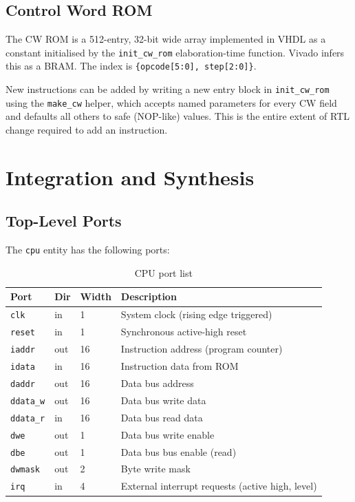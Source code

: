 \documentclass[a4paper,12pt]{report}
\newcommand{\asm}[1]{\texttt{#1}}
\newcommand{\signal}[1]{\texttt{#1}}
\begin{document}
\section{Control Word ROM}
\label{sec:cwrom}

The CW ROM is a 512-entry, 32-bit wide array implemented in VHDL as a constant initialised by the \asm{init\_cw\_rom} elaboration-time function. Vivado infers this as a BRAM. The index is \texttt{\{opcode[5:0], step[2:0]\}}.

New instructions can be added by writing a new entry block in \asm{init\_cw\_rom} using the \asm{make\_cw} helper, which accepts named parameters for every CW field and defaults all others to safe (NOP-like) values. This is the entire extent of RTL change required to add an instruction.

\chapter{Integration and Synthesis}
\label{ch:integration}

\section{Top-Level Ports}

The \texttt{cpu} entity has the following ports:

\begin{table}[htbp]
\centering
\caption{CPU port list}
\begin{tabularx}{\textwidth}{lllX}
    \toprule
    \textbf{Port} & \textbf{Dir} & \textbf{Width} & \textbf{Description} \\
    \midrule
    \signal{clk}     & in  &  1 & System clock (rising edge triggered) \\
    \signal{reset}   & in  &  1 & Synchronous active-high reset \\
    \signal{iaddr}   & out & 16 & Instruction address (program counter) \\
    \signal{idata}   & in  & 16 & Instruction data from ROM \\
    \signal{daddr}   & out & 16 & Data bus address \\
    \signal{ddata\_w} & out & 16 & Data bus write data \\
    \signal{ddata\_r} & in  & 16 & Data bus read data \\
    \signal{dwe}     & out &  1 & Data bus write enable \\
    \signal{dbe}     & out &  1 & Data bus bus enable (read) \\
    \signal{dwmask}  & out &  2 & Byte write mask \\
    \signal{irq}     & in  &  4 & External interrupt requests (active high, level) \\
    \bottomrule
\end{tabularx}
\end{table}
\end{document}
